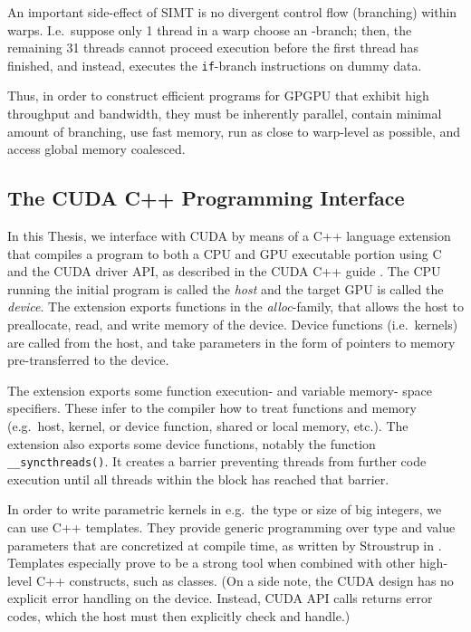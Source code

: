   An important side-effect of SIMT is no divergent control flow (branching)
  within warps. I.e.\ suppose only 1 thread in a warp choose an -branch;
  then, the remaining 31 threads cannot proceed execution before the first
  thread has finished, and instead, executes the \texttt{if}-branch instructions
  on dummy data.

  Thus, in order to construct efficient programs for GPGPU that exhibit high
  throughput and bandwidth, they must be inherently parallel, contain minimal
  amount of branching, use fast memory, run as close to warp-level as possible,
  and access global memory coalesced.

\subsection{The CUDA C++ Programming Interface}
\label{subsec:cuda}

In this Thesis, we interface with CUDA by means of a C++ language extension that
compiles a program to both a CPU and GPU executable portion using C and the CUDA
driver API, as described in the CUDA C++ guide \cite{cudaguide}. The CPU running
the initial program is called the \textit{host} and the target GPU is called the
\textit{device}. The extension exports functions in the \textit{alloc}-family,
that allows the host to preallocate, read, and write memory of the
device. Device functions (i.e.\ kernels) are called from the host, and take
parameters in the form of pointers to memory pre-transferred to the device.

The extension exports some function execution- and variable memory- space
specifiers. These infer to the compiler how to treat functions and memory (e.g.\
host, kernel, or device function, shared or local memory, etc.). The extension
also exports some device functions, notably the function
\texttt{\_\_syncthreads()}. It creates a barrier preventing threads from further
code execution until all threads within the block has reached that barrier.

In order to write parametric kernels in e.g.\ the type or size of big integers,
we can use C++ templates. They provide generic programming over type and value
parameters that are concretized at compile time, as written by Stroustrup in
\cite{stroustrup}. Templates especially prove to be a strong tool when combined
with other high-level C++ constructs, such as classes.  (On a side note, the
CUDA design has no explicit error handling on the device. Instead, CUDA API
calls returns error codes, which the host must then explicitly check and
handle.)

